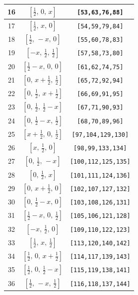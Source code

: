 \documentclass[fleqn,8pt]{jsarticle}
\begin{document}
\begin{longtable}{ccc}
16 & $\left[ \frac{1}{2},\, 0,\, x \right]$ & {\tt [53,63,76,88]} \\ \hline
17 & $\left[ \frac{1}{2},\, x,\, 0 \right]$ & {\tt [54,59,79,84]} \\ \hline
18 & $\left[ \frac{1}{2},\, - x,\, 0 \right]$ & {\tt [55,60,78,83]} \\ \hline
19 & $\left[ - x,\, \frac{1}{2},\, \frac{1}{2} \right]$ & {\tt [57,58,73,80]} \\ \hline
20 & $\left[ \frac{1}{2} - x,\, 0,\, 0 \right]$ & {\tt [61,62,74,75]} \\ \hline
21 & $\left[ 0,\, x + \frac{1}{2},\, \frac{1}{2} \right]$ & {\tt [65,72,92,94]} \\ \hline
22 & $\left[ 0,\, \frac{1}{2},\, x + \frac{1}{2} \right]$ & {\tt [66,69,91,95]} \\ \hline
23 & $\left[ 0,\, \frac{1}{2},\, \frac{1}{2} - x \right]$ & {\tt [67,71,90,93]} \\ \hline
24 & $\left[ 0,\, \frac{1}{2} - x,\, \frac{1}{2} \right]$ & {\tt [68,70,89,96]} \\ \hline
25 & $\left[ x + \frac{1}{2},\, 0,\, \frac{1}{2} \right]$ & {\tt [97,104,129,130]} \\ \hline
26 & $\left[ x,\, \frac{1}{2},\, 0 \right]$ & {\tt [98,99,133,134]} \\ \hline
27 & $\left[ 0,\, \frac{1}{2},\, - x \right]$ & {\tt [100,112,125,135]} \\ \hline
28 & $\left[ 0,\, \frac{1}{2},\, x \right]$ & {\tt [101,111,124,136]} \\ \hline
29 & $\left[ 0,\, x + \frac{1}{2},\, 0 \right]$ & {\tt [102,107,127,132]} \\ \hline
30 & $\left[ 0,\, \frac{1}{2} - x,\, 0 \right]$ & {\tt [103,108,126,131]} \\ \hline
31 & $\left[ \frac{1}{2} - x,\, 0,\, \frac{1}{2} \right]$ & {\tt [105,106,121,128]} \\ \hline
32 & $\left[ - x,\, \frac{1}{2},\, 0 \right]$ & {\tt [109,110,122,123]} \\ \hline
33 & $\left[ \frac{1}{2},\, x,\, \frac{1}{2} \right]$ & {\tt [113,120,140,142]} \\ \hline
34 & $\left[ \frac{1}{2},\, 0,\, x + \frac{1}{2} \right]$ & {\tt [114,117,139,143]} \\ \hline
35 & $\left[ \frac{1}{2},\, 0,\, \frac{1}{2} - x \right]$ & {\tt [115,119,138,141]} \\ \hline
36 & $\left[ \frac{1}{2},\, - x,\, \frac{1}{2} \right]$ & {\tt [116,118,137,144]} \\ \hline

\end{longtable}
\end{document}
